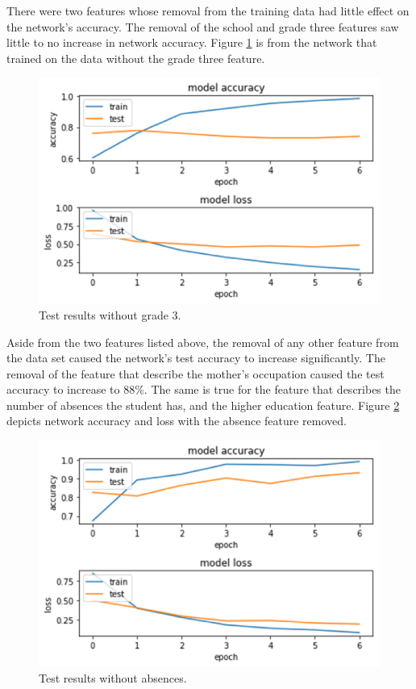 \documentclass[conference]{IEEEtran}
\begin{document}
There were two features whose removal from the training data had little effect on the network’s accuracy. The removal of the school and grade three features saw little to no increase in network accuracy. Figure \ref{results2} is from the network that trained on the data without the grade three feature.

\begin{figure}[htbp]
\centerline{\includegraphics[width=\linewidth]{results2.png}}
\caption{Test results without grade 3.}
\label{results2}
\end{figure}

Aside from the two features listed above, the removal of any other feature from the data set caused the network’s test accuracy to increase significantly. The removal of the feature that describe the mother’s occupation caused the test accuracy to increase to 88\%. The same is true for the feature that describes the number of absences the student has, and the higher education feature. Figure \ref{results3} depicts network accuracy and loss with the absence feature removed.

\begin{figure}[htbp]
\centerline{\includegraphics[width=\linewidth]{results3.png}}
\caption{Test results without absences.}
\label{results3}
\end{figure}
\end{document}
